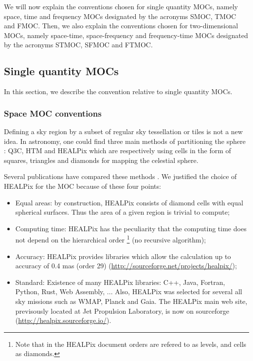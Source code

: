 \documentclass[11pt,a4paper]{ivoa}
\begin{document}
\medskip
\par\noindent
We will now explain the conventions chosen for single quantity MOCs,
namely space, time and frequency MOCs designated by the acronyms SMOC,
TMOC and FMOC.
Then, we also explain the conventions chosen for two-dimensional MOCs,
namely space-time, space-frequency and frequency-time MOCs
designated by the acronyms STMOC, SFMOC and FTMOC.

\subsection{Single quantity MOCs}

In this section, we describe the convention relative to single quantity MOCs.

\subsubsection{Space MOC conventions}
Defining a sky region by a subset of regular sky tessellation or tiles
is not a new idea.  In astronomy, one could find three main methods of
partitioning the sphere : Q3C, HTM and HEALPix which are respectively
using cells in the form of squares, triangles and diamonds for mapping
the celestial sphere.

Several publications have compared these methods \citep{2001misk.conf..638O}. We
justified the choice of HEALPix for the MOC because of these four
points:

\begin{itemize}
\item Equal areas: by construction, HEALPix consists of diamond cells with
  equal spherical surfaces. Thus the area of a given region is trivial
  to compute;
\item Computing time: HEALPix has the peculiarity that the computing
  time does not depend on the hierarchical order \footnote{Note that in the HEALPix
  document orders are refered to as levels, and cells as diamonds.}
  (no recursive  algorithm);
\item Accuracy: HEALPix provides libraries which allow the calculation
  up to accuracy of 0.4 mas (order 29) (\url{http://sourceforge.net/projects/healpix/});
\item Standard: Existence of many HEALPix libraries: C++, Java,
  Fortran, Python, Rust, Web Assembly, ...
  Also, HEALPix was selected for several all sky
  missions such as WMAP, Planck and Gaia. The HEALPix main web site, previsously
  located at Jet Propulsion Laboratory, is now on sourceforge (\url{http://healpix.sourceforge.io/}).
\end{itemize}
\end{document}
